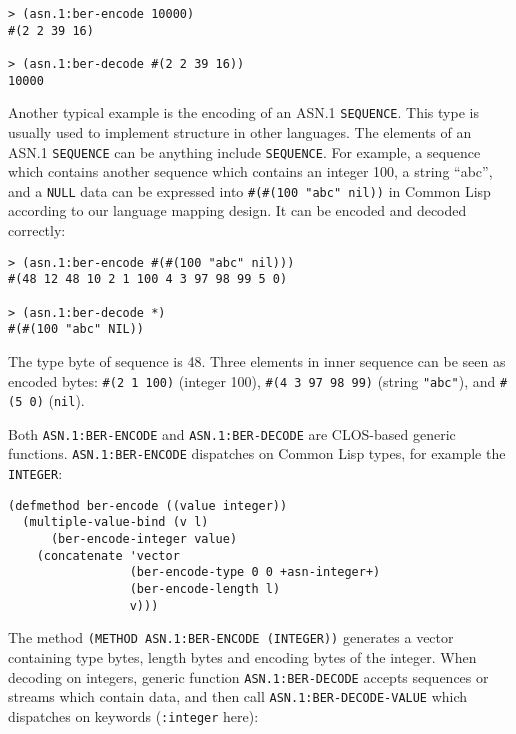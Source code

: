 \documentclass[reprint,natbib,9pt]{sigplanconf}
\begin{document}
\begin{verbatim}
> (asn.1:ber-encode 10000)
#(2 2 39 16)

> (asn.1:ber-decode #(2 2 39 16))
10000
\end{verbatim}

Another typical example is the encoding of an ASN.1 \texttt{SEQUENCE}.
This type is usually used to implement structure in other languages.
The elements of an ASN.1 \texttt{SEQUENCE} can be anything include
\texttt{SEQUENCE}.  For example, a sequence which contains another
sequence which contains an integer 100, a string ``abc'', and a
\texttt{NULL} data can be expressed into \texttt{\#(\#(100 "abc"
  nil))} in Common Lisp according to our language mapping design. It
can be encoded and decoded correctly:
%
\begin{verbatim}
> (asn.1:ber-encode #(#(100 "abc" nil)))
#(48 12 48 10 2 1 100 4 3 97 98 99 5 0)

> (asn.1:ber-decode *)
#(#(100 "abc" NIL))
\end{verbatim}

The type byte of sequence is 48. Three elements in inner sequence can
be seen as encoded bytes: \texttt{\#(2 1 100)} (integer 100),
\texttt{\#(4 3 97 98 99)} (string \texttt{"abc"}), and \texttt{\#(5 0)}
(\texttt{nil}).

Both \texttt{ASN.1:BER-ENCODE} and \texttt{ASN.1:BER-DECODE} are
CLOS-based generic functions. \texttt{ASN.1:BER-ENCODE} dispatches on
Common Lisp types, for example the \texttt{INTEGER}:

\begin{verbatim}
(defmethod ber-encode ((value integer))
  (multiple-value-bind (v l)
      (ber-encode-integer value)
    (concatenate 'vector
                 (ber-encode-type 0 0 +asn-integer+)
                 (ber-encode-length l)
                 v)))
\end{verbatim}

The method \texttt{(METHOD ASN.1:BER-ENCODE (INTEGER))} generates a
vector containing type bytes, length bytes and encoding bytes of the
integer. When decoding on integers, generic function
\texttt{ASN.1:BER-DECODE} accepts sequences or streams which contain
data, and then call \texttt{ASN.1:BER-DECODE-VALUE} which dispatches
on keywords (\texttt{:integer} here):
\end{document}
